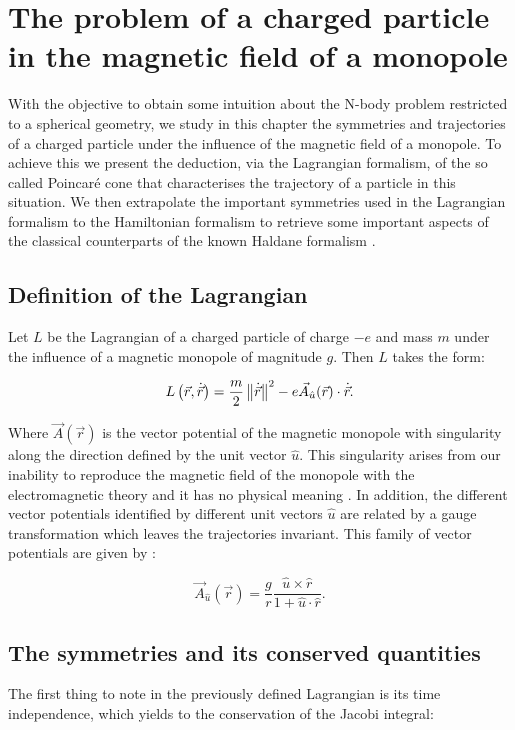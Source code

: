 \chapter{The problem of a charged particle in the magnetic field of a monopole}

With the objective to obtain some intuition about the N-body problem restricted to a spherical geometry, we study in this chapter the symmetries and trajectories of a charged particle under the influence of the magnetic field of a monopole. To achieve this we present the deduction, via the Lagrangian formalism, of the so called Poincar\'e cone \cite{poincare} that characterises the trajectory of a particle in this situation. We then extrapolate the important symmetries used in the Lagrangian formalism to the Hamiltonian formalism to retrieve some important aspects of the classical counterparts of the known Haldane formalism \cite{haldane}.\\

\section{Definition of the Lagrangian}
Let $L$ be the Lagrangian of a charged particle of charge $-e$ and mass $m$ under the influence of a magnetic monopole of magnitude $g$. Then $L$ takes the form:

\begin{equation}
L\left( \vec{r},\dot{\vec{r}} \right) = \frac{m}{2}\left\lVert \dot{\vec{r}} \right\rVert^2 - e\vec{A}_{\hat{u}}(\vec{r})\cdot\dot{\vec{r}}.
\label{eq:lagrangian}
\end{equation}

Where $\vec{A}(\vec{r})$ is the vector potential of the magnetic monopole with singularity along the direction defined by the unit vector $\hat{u}$. This singularity arises from our inability to reproduce the magnetic field of the monopole with the electromagnetic theory and it has no physical meaning \cite{haldane}. In addition, the different vector potentials identified by different unit vectors $\hat{u}$ are related by a gauge transformation which leaves the trajectories invariant. This family of vector potentials are given by \cite{vectorPotentials}:

\begin{equation}
\vec{A}_{\hat{u}}(\vec{r}) = \frac{g}{r}\frac{\hat{u}\times\hat{r}}{1+\hat{u}\cdot\hat{r}}.
\label{eq:monopolepotential}
\end{equation}

\section{The symmetries and its conserved quantities}
The first thing to note in the previously defined Lagrangian is its time independence, which yields to the conservation of the Jacobi integral:

